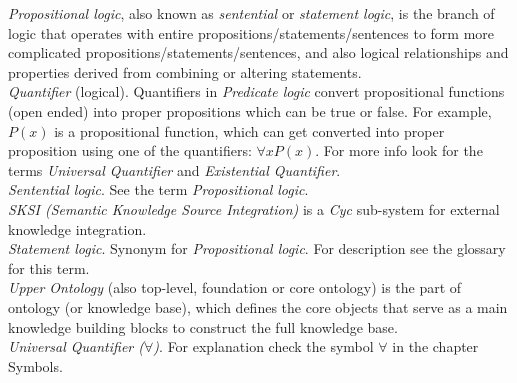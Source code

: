 \emph{Propositional logic}, also known as \emph{sentential} or 
\emph{statement logic}, is the branch of logic that operates with entire
propositions/statements/sentences to form more complicated 
propositions/statements/sentences, and also logical relationships and properties
derived from combining  or altering statements.\\

\emph{Quantifier} (logical). Quantifiers in \emph{Predicate logic} convert
propositional functions (open ended) into proper propositions which can be true
or false. For example, $P(x)$ is a propositional function, which can get
converted into proper proposition using one of the quantifiers: 
$\forall x P(x)$. For more info look for the terms \emph{Universal Quantifier}
and \emph{Existential Quantifier}.\\

\emph{Sentential logic}. See the term \emph{Propositional logic}.\\

\emph{SKSI (Semantic Knowledge Source Integration)} is a \emph{Cyc} sub-system
for external knowledge integration.\\

\emph{Statement logic}. Synonym for \emph{Propositional logic}. For description
see the glossary for this term.\\

\emph{Upper Ontology} (also top-level, foundation or core ontology) is the part
of ontology (or knowledge base), which defines the core objects that serve as a
main knowledge building blocks to construct the full knowledge base.\\

\emph{Universal Quantifier ($\forall$)}. For explanation check the symbol 
$\forall$ in the chapter Symbols. \\
